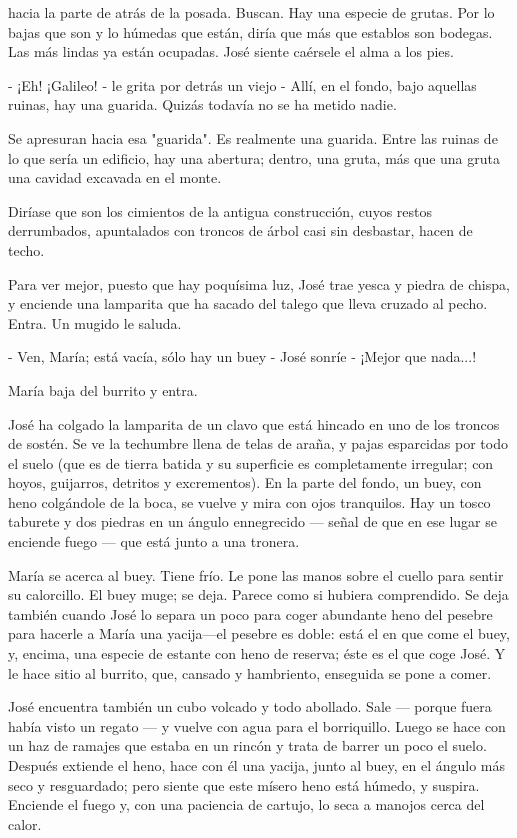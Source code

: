 \documentclass[12pt]{book} %
\begin{document}
hacia la parte de atrás de la posada. Buscan. Hay una especie de grutas. Por lo bajas que son y lo húmedas que están, diría que más que establos son bodegas. Las más lindas ya están ocupadas. José siente caérsele el alma a los pies. 

- ¡Eh! ¡Galileo! - le grita por detrás un viejo - Allí, en el fondo, bajo aquellas ruinas, hay una guarida. Quizás todavía no se ha metido nadie. 

Se apresuran hacia esa "guarida". Es realmente una guarida. Entre las ruinas de lo que sería un edificio, hay una abertura; dentro, una gruta, más que una gruta una cavidad excavada en el monte. 

Diríase que son los cimientos de la antigua construcción, cuyos restos derrumbados, apuntalados con troncos de árbol casi sin desbastar, hacen de techo. 

Para ver mejor, puesto que hay poquísima luz, José trae yesca y piedra de chispa, y enciende una lamparita que ha sacado del talego que lleva cruzado al pecho. Entra. Un mugido le saluda. 

- Ven, María; está vacía, sólo hay un buey - José sonríe - ¡Mejor que nada...! 

María baja del burrito y entra. 

José ha colgado la lamparita de un clavo que está hincado en uno de los troncos de sostén. Se ve la techumbre llena de telas de araña, y pajas esparcidas por todo el suelo (que es de tierra batida y su superficie es completamente irregular; con hoyos, guijarros, detritos y excrementos). En la parte del fondo, un buey, con heno colgándole de la boca, se vuelve y mira con ojos tranquilos. Hay un tosco taburete y dos piedras en un ángulo ennegrecido — señal de que en ese lugar se enciende fuego — que está junto a una tronera. 

María se acerca al buey. Tiene frío. Le pone las manos sobre el cuello para sentir su calorcillo. El buey muge; se deja. Parece como si hubiera comprendido. Se deja también cuando José lo separa un poco para coger abundante heno del pesebre para hacerle a María una yacija—el pesebre es doble: está el en que come el buey, y, encima, una especie de estante con heno de reserva; éste es el que coge José. Y le hace sitio al burrito, que, cansado y hambriento, enseguida se pone a comer. 

José encuentra también un cubo volcado y todo abollado. Sale — porque fuera había visto un regato — y vuelve con agua para el borriquillo. Luego se hace con un haz de ramajes que estaba en un rincón y trata de barrer un poco el suelo. Después extiende el heno, hace con él una yacija, junto al buey, en el ángulo más seco y resguardado; pero siente que este mísero heno está húmedo, y suspira. Enciende el fuego y, con una paciencia de cartujo, lo seca a manojos cerca del calor. 
\end{document}
